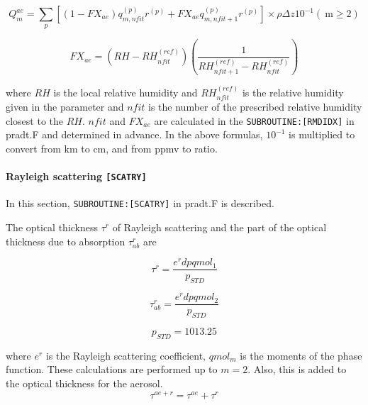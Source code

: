 \begin{equation}
Q_{m}^{a e}=\sum_{p}\left[\left(1-F X_{a e}\right) q_{m, n f i t}^{(p)} r^{(p)}+F X_{a e} q_{m, n f i t+1}^{(p)} r^{(p)}\right] \times \rho \Delta z 10^{-1}(\mathrm{~m} \geq 2)
\end{equation}

\begin{equation}
F X_{a e}=\left(R H-R H_{n f i t}^{(r e f)}\right)\left(\frac{1}{R H_{n f i t+1}^{(r e f)}-R H_{n f i t}^{(r e f)}}\right)
\end{equation}

where \(RH\) is the local relative humidity and
\(R H_{n f i t}^{(r e f)}\) is the relative humidity given in the
parameter and \(nfit\) is the number of the prescribed relative humidity
closest to the \(RH\). \(nfit\) and \(FX_{ae}\) are calculated in the
\texttt{SUBROUTINE:{[}RMDIDX{]}} in pradt.F and determined in advance.
In the above formulas, \(10^{-1}\) is multiplied to convert from
\(\mathrm{km}\) to \(\mathrm{cm}\), and from ppmv to ratio.

\hypertarget{rayleigh-scattering-scatry}{%
\paragraph{\texorpdfstring{Rayleigh scattering
\texttt{{[}SCATRY{]}}}{Rayleigh scattering {[}SCATRY{]}}}\label{rayleigh-scattering-scatry}}

In this section, \texttt{SUBROUTINE:{[}SCATRY{]}} in pradt.F is
described.

The optical thickness \(\tau^{r}\) of Rayleigh scattering and the part
of the optical thickness due to absorption \(\tau_{ab}^{r}\) are

\begin{equation}
\tau^{r}=\frac{e^{r} d p q m o l_{1}}{p_{S T D}}
\end{equation}

\begin{equation}
\tau_{ab}^{r}=\frac{e^{r} d p q m o l_{2}}{p_{S T D}}
\end{equation}

\begin{equation}
p_{S T D}=1013.25
\end{equation}

where \(e^{r}\) is the Rayleigh scattering coefficient, \(qmol_m\) is
the moments of the phase function. These calculations are performed up
to \(m=2\). Also, this is added to the optical thickness for the
aerosol. \begin{equation}
\tau^{a e+r}=\tau^{a e}+\tau^{r}
\end{equation}

